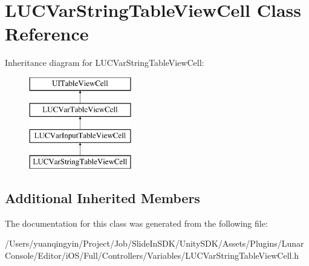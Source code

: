 \hypertarget{interface_l_u_c_var_string_table_view_cell}{}\section{L\+U\+C\+Var\+String\+Table\+View\+Cell Class Reference}
\label{interface_l_u_c_var_string_table_view_cell}
Inheritance diagram for L\+U\+C\+Var\+String\+Table\+View\+Cell\+:\begin{figure}[H]
\begin{center}
\leavevmode
\includegraphics[height=4.000000cm]{interface_l_u_c_var_string_table_view_cell}
\end{center}
\end{figure}
\subsection*{Additional Inherited Members}


The documentation for this class was generated from the following file\+:\begin{DoxyCompactItemize}
\item 
/\+Users/yuanqingyin/\+Project/\+Job/\+Slide\+In\+S\+D\+K/\+Unity\+S\+D\+K/\+Assets/\+Plugins/\+Lunar\+Console/\+Editor/i\+O\+S/\+Full/\+Controllers/\+Variables/L\+U\+C\+Var\+String\+Table\+View\+Cell.\+h\end{DoxyCompactItemize}
